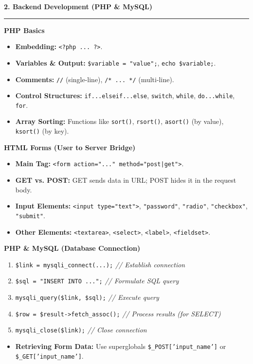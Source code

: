 \documentclass[a4paper, 8pt]{extarticle}
\newcommand{\sectionheading}[1]{\large\textbf{#1}\par\noindent\rule{\linewidth}{0.4pt}}
\newcommand{\subsectionheading}[1]{\normalsize\textbf{#1}}
\begin{document}
\begin{multicols}{2}
\sectionheading{2. Backend Development (PHP \& MySQL)}
\vspace{0.5em}
\subsectionheading{PHP Basics}
\begin{itemize}
    \item \textbf{Embedding:} \texttt{<?php ... ?>}.
    \item \textbf{Variables \& Output:} \texttt{\$variable = "value";}, \texttt{echo \$variable;}.
    \item \textbf{Comments:} \texttt{//} (single-line), \texttt{/* ... */} (multi-line).
    \item \textbf{Control Structures:} \texttt{if...elseif...else}, \texttt{switch}, \texttt{while}, \texttt{do...while}, \texttt{for}.
    \item \textbf{Array Sorting:} Functions like \texttt{sort()}, \texttt{rsort()}, \texttt{asort()} (by value), \texttt{ksort()} (by key).
\end{itemize}

\subsectionheading{HTML Forms (User to Server Bridge)}
\begin{itemize}
    \item \textbf{Main Tag:} \texttt{<form action="..." method="post|get">}.
    \item \textbf{GET vs. POST:} GET sends data in URL; POST hides it in the request body.
    \item \textbf{Input Elements:} \texttt{<input type="text">}, \texttt{"password"}, \texttt{"radio"}, \texttt{"checkbox"}, \texttt{"submit"}.
    \item \textbf{Other Elements:} \texttt{<textarea>}, \texttt{<select>}, \texttt{<label>}, \texttt{<fieldset>}.
\end{itemize}

\subsectionheading{PHP \& MySQL (Database Connection)}
\begin{tcolorbox}[title=\textbf{Typical DB Operation Flow (Procedural)}]
    \begin{enumerate}
        \item \texttt{\$link = mysqli\_connect(...);} \textit{// Establish connection}
        \item \texttt{\$sql = "INSERT INTO ...";} \textit{// Formulate SQL query}
        \item \texttt{mysqli\_query(\$link, \$sql);} \textit{// Execute query}
        \item \texttt{\$row = \$result->fetch\_assoc();} \textit{// Process results (for SELECT)}
        \item \texttt{mysqli\_close(\$link);} \textit{// Close connection}
    \end{enumerate}
\end{tcolorbox}
\begin{itemize}
    \item \textbf{Retrieving Form Data:} Use superglobals \texttt{\$\_POST['input\_name']} or \texttt{\$\_GET['input\_name']}.
\end{itemize}

\end{multicols}
\end{document}
